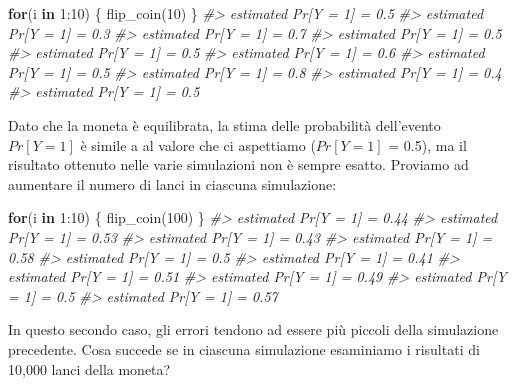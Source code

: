 \documentclass[
  11pt,
]{krantz}
\makeatletter
\newenvironment{Shaded}{\begin{snugshade}}{\end{snugshade}}
\newcommand{\CommentTok}[1]{\textcolor[rgb]{0.37,0.37,0.37}{\textit{#1}}}
\newcommand{\ControlFlowTok}[1]{\textcolor[rgb]{0.27,0.27,0.27}{\textbf{#1}}}
\newcommand{\DecValTok}[1]{\textcolor[rgb]{0.06,0.06,0.06}{#1}}
\newcommand{\FunctionTok}[1]{\textcolor[rgb]{0,0,0}{#1}}
\newcommand{\NormalTok}[1]{#1}
\newcommand{\SpecialCharTok}[1]{\textcolor[rgb]{0,0,0}{#1}}
\newenvironment{kframe}{%
\medskip{}
\setlength{\fboxsep}{.8em}
 \def\at@end@of@kframe{}%
 \ifinner\ifhmode%
  \def\at@end@of@kframe{\end{minipage}}%
  \begin{minipage}{\columnwidth}%
 \fi\fi%
 \def\FrameCommand##1{\hskip\@totalleftmargin \hskip-\fboxsep
 \colorbox{shadecolor}{##1}\hskip-\fboxsep
     \hskip-\linewidth \hskip-\@totalleftmargin \hskip\columnwidth}%
 \MakeFramed {\advance\hsize-\width
   \@totalleftmargin\z@ \linewidth\hsize
   \@setminipage}}%
 {\par\unskip\endMakeFramed%
 \at@end@of@kframe}
\renewenvironment{Shaded}{\begin{kframe}}{\end{kframe}}
\theoremstyle{definition}
\theoremstyle{definition}
\theoremstyle{definition}
\theoremstyle{definition}
\theoremstyle{remark}
\makeatother
\begin{document}
\begin{Shaded}
\begin{Highlighting}[]
\ControlFlowTok{for}\NormalTok{(i }\ControlFlowTok{in} \DecValTok{1}\SpecialCharTok{:}\DecValTok{10}\NormalTok{) \{}
  \FunctionTok{flip\_coin}\NormalTok{(}\DecValTok{10}\NormalTok{)}
\NormalTok{\}}
\CommentTok{\#\textgreater{} estimated Pr[Y = 1] = 0.5 }
\CommentTok{\#\textgreater{} estimated Pr[Y = 1] = 0.3 }
\CommentTok{\#\textgreater{} estimated Pr[Y = 1] = 0.7 }
\CommentTok{\#\textgreater{} estimated Pr[Y = 1] = 0.5 }
\CommentTok{\#\textgreater{} estimated Pr[Y = 1] = 0.5 }
\CommentTok{\#\textgreater{} estimated Pr[Y = 1] = 0.6 }
\CommentTok{\#\textgreater{} estimated Pr[Y = 1] = 0.5 }
\CommentTok{\#\textgreater{} estimated Pr[Y = 1] = 0.8 }
\CommentTok{\#\textgreater{} estimated Pr[Y = 1] = 0.4 }
\CommentTok{\#\textgreater{} estimated Pr[Y = 1] = 0.5}
\end{Highlighting}
\end{Shaded}

\noindent Dato che la moneta è equilibrata, la stima delle probabilità dell'evento \(Pr[Y = 1]\) è simile a al valore che ci aspettiamo (\(Pr[Y = 1]\) = 0.5), ma il risultato ottenuto nelle varie simulazioni non è sempre esatto. Proviamo ad aumentare il numero di lanci in ciascuna simulazione:

\begin{Shaded}
\begin{Highlighting}[]
\ControlFlowTok{for}\NormalTok{(i }\ControlFlowTok{in} \DecValTok{1}\SpecialCharTok{:}\DecValTok{10}\NormalTok{) \{}
  \FunctionTok{flip\_coin}\NormalTok{(}\DecValTok{100}\NormalTok{)}
\NormalTok{\}}
\CommentTok{\#\textgreater{} estimated Pr[Y = 1] = 0.44 }
\CommentTok{\#\textgreater{} estimated Pr[Y = 1] = 0.53 }
\CommentTok{\#\textgreater{} estimated Pr[Y = 1] = 0.43 }
\CommentTok{\#\textgreater{} estimated Pr[Y = 1] = 0.58 }
\CommentTok{\#\textgreater{} estimated Pr[Y = 1] = 0.5 }
\CommentTok{\#\textgreater{} estimated Pr[Y = 1] = 0.41 }
\CommentTok{\#\textgreater{} estimated Pr[Y = 1] = 0.51 }
\CommentTok{\#\textgreater{} estimated Pr[Y = 1] = 0.49 }
\CommentTok{\#\textgreater{} estimated Pr[Y = 1] = 0.5 }
\CommentTok{\#\textgreater{} estimated Pr[Y = 1] = 0.57}
\end{Highlighting}
\end{Shaded}

\noindent In questo secondo caso, gli errori tendono ad essere più piccoli della simulazione precedente. Cosa succede se in ciascuna simulazione esaminiamo i risultati di 10,000 lanci della moneta?
\end{document}
